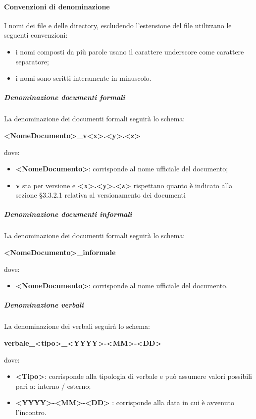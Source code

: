 			\paragraph{Convenzioni di denominazione}
				I nomi dei file e delle directory, escludendo l’estensione del file utilizzano le seguenti convenzioni:\\
				\begin{itemize}
					\item i nomi composti da più parole usano il carattere underscore come carattere separatore;
					\item i nomi sono scritti interamente in minuscolo.
				\end{itemize}
				\subparagraph{Denominazione documenti formali}
					La denominazione dei documenti formali seguirà lo schema:  \\
					\begin{center}
						\textbf{<NomeDocumento>\_v<x>.<y>.<z>}
					\end{center}
					dove: \\
					\begin{itemize}
						\item\textbf{<NomeDocumento>}: corrisponde al nome ufficiale del documento; 
						\item\textbf{v} sta per versione e \textbf{<x>.<y>.<z>} rispettano quanto è indicato alla sezione §3.3.2.1 relativa al versionamento dei documenti
					\end{itemize}
				\subparagraph{Denominazione documenti informali}
					La denominazione dei documenti formali seguirà lo schema:  \\
					\begin{center}
						\textbf{<NomeDocumento>\_informale}
					\end{center}
					dove: \\
					\begin{itemize}
						\item\textbf{<NomeDocumento>}: corrisponde al nome ufficiale del documento.
					\end{itemize}
				\subparagraph{Denominazione verbali}
					La denominazione dei verbali seguirà lo schema:  \\
					\begin{center}
						\textbf{verbale\_<tipo>\_<YYYY>-<MM>-<DD>}
					\end{center}
					dove: \\
					\begin{itemize}
						\item\textbf{<Tipo>}: corrisponde alla tipologia di verbale e può assumere valori possibili pari a: interno / esterno;
						\item\textbf{<YYYY>-<MM>-<DD> }: corrisponde alla data in cui è avvenuto l’incontro.
					\end{itemize}
